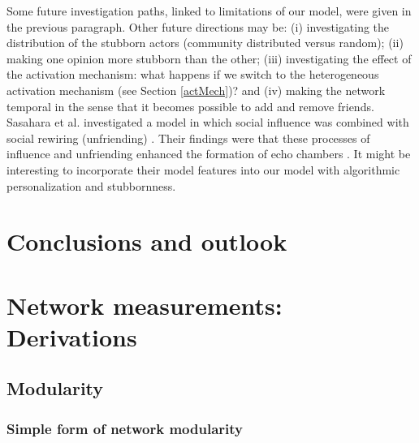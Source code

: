 \documentclass[11 pt , letterpaper , twoside , openright]{book}
\begin{document}
\newline
Some future investigation paths, linked to limitations of our model, were given in the previous paragraph. Other future directions may be: (i) investigating the distribution of the stubborn actors (community distributed versus random); (ii) making one opinion more stubborn than the other; (iii) investigating the effect of the activation mechanism: what happens if we switch to the heterogeneous activation mechanism (see Section \ref{actMech})? and (iv) making the network temporal in the sense that it becomes possible to add and remove friends. Sasahara et al. investigated a model in which social influence was combined with social rewiring (unfriending) \cite{Sasahara2020}. Their findings were that these processes of influence and unfriending enhanced the formation of echo chambers \cite{Sasahara2020}. It might be interesting to incorporate their model features into our model with algorithmic personalization and stubbornness. 



\chapter{Conclusions and outlook}
\newpage

\pagestyle{fancy}
\fancyhf{}
\lhead{\textcolor{NavyBlue}{\appendixname} \ \textcolor{NavyBlue}{\thechapter}}
\rhead{\rightmark}
\cfoot{\thepage}

\appendix
\addappheadtotoc 

\chapter{Network measurements: Derivations}
\section{Modularity}\label{modul}
\subsection{Simple form of network modularity}\label{simplemod}
\end{document}
